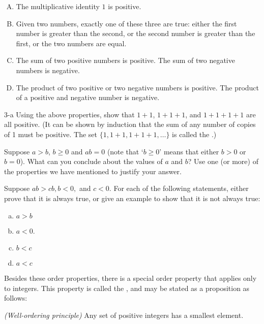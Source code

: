 \begin{enumerate}[(A)] 
\item
The multiplicative identity $1$ is positive.
\item
Given two numbers, exactly one of these three are true: either the first number is greater than the second, or the second number is greater than the first, or the two numbers are equal.
\item
The sum of two  positive numbers  is positive. The sum of two negative numbers is negative.
\item
The product of two  positive or two negative numbers is positive. The product of a positive and negative number is negative.
\end{enumerate}

\begin{exercise}{3-a}
Using the above properties, show that $1+1$, $1+1+1$, and $1+1+1+1$ are all positive. (It can be shown by induction that the sum of any number of copies of 1 must be positive. The set $\{1, 1+1, 1+1+1, \ldots\}$ is called the .)
\end{exercise}


\begin{exercise}{3}
Suppose $a > b$,  $b \ge 0$ and $ab = 0$ (note that `$b \ge 0$' means that either $b>0$ or $b=0$).  What can you conclude about the values of $a$ and $b$? Use one (or more)  of the properties we have mentioned to justify your answer.
\end{exercise}

\begin{exercise}{}
Suppose $ab>cb, b < 0,$ and $c<0$.  For each of the following statements, either prove that it is always true, or give an example to show that
it is not always true:
\begin{enumerate}[(a)]
\item
$a > b$ \qquad 
\item
$a < 0$.
\item
$b < c$ \qquad 
\item
$a < c$ \qquad 
\end{enumerate}
\end{exercise}

Besides these order properties, there is a special order property that applies only to integers. This property is called the , and may be stated as a proposition as follows:

\begin{prop}{}\emph{(Well-ordering principle)}
Any set of positive integers  has a smallest element.
\end{prop}

